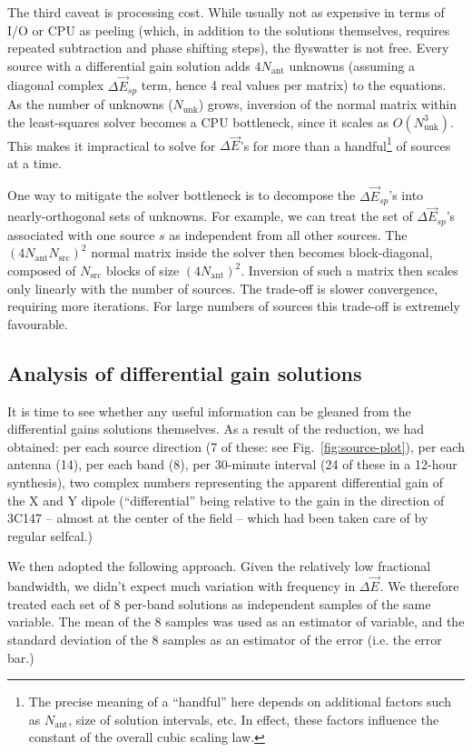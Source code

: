 \documentclass[]{aa}
\newcommand{\jones}[2]{\vec {#1}_{#2}}
\begin{document}
The third caveat is processing cost. While usually not as expensive in terms of I/O or CPU as peeling (which, in addition to the solutions themselves, requires repeated subtraction and phase shifting steps), the flyswatter is not free. Every source with a differential gain solution adds $4N_\mathrm{ant}$ unknowns (assuming a diagonal complex $\Delta\jones{E}{sp}$ term, hence 4 real values per matrix) to the equations. As the number of unknowns ($N_\mathrm{unk}$) grows, inversion of the normal matrix within the least-squares solver becomes a CPU bottleneck, since it scales as $O(N_\mathrm{unk}^3)$. This makes it impractical to solve for $\Delta\jones{E}{}$'s for more than a handful\footnote{The precise meaning of a ``handful'' here depends on additional factors such as $N_\mathrm{ant}$, size of solution intervals, etc. In effect, these factors influence the constant of the overall cubic scaling law.} of sources at a time. 

One way to mitigate the solver bottleneck is to decompose the $\Delta\jones{E}{sp}$'s into nearly-orthogonal sets of unknowns. For example, we can treat the set of $\Delta\jones{E}{sp}$'s associated with one source $s$ as independent from all other sources. The $(4N_\mathrm{ant}N_\mathrm{src})^2$ normal matrix inside the solver then becomes block-diagonal, composed of $N_\mathrm{src}$ blocks of size $(4N_\mathrm{ant})^2$. Inversion of such a matrix then scales only linearly with the number of sources. The trade-off is slower convergence, requiring more iterations. For large numbers of sources this trade-off is extremely favourable.

\subsection{Analysis of differential gain solutions\label{sec:de-analysis}}

It is time to see whether any useful information can be gleaned from the differential gains solutions themselves. As a result of the reduction, we had obtained: per each source direction (7 of these: see Fig.~\ref{fig:source-plot}), per each antenna (14), per each band (8), per 30-minute interval (24 of these in a 12-hour synthesis), two complex numbers representing the apparent differential gain of the X and Y dipole (``differential'' being relative to the gain in the direction of 3C147 -- almost at the center of the field -- which had been taken care of by regular selfcal.)

We then adopted the following approach. Given the relatively low fractional bandwidth, we didn't expect much variation with frequency in $\Delta\jones{E}{}$. We therefore treated each set of 8 per-band solutions as independent samples of the same variable. The mean of the 8 samples was used as an estimator of variable, and the standard deviation of the 8 samples as an estimator of the error (i.e. the error bar.)
\end{document}
